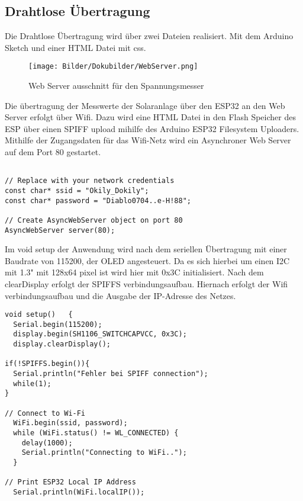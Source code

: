 \documentclass[ngerman]{mucproc}
\newenvironment{minted}[2][]{\endgraf\verbatim}{\endverbatim}
\begin{document}
\subsection{Drahtlose Übertragung}

Die Drahtlose Übertragung wird über zwei Dateien realisiert. Mit dem Arduino Sketch und einer HTML Datei mit css.


\begin{figure}
			\centering
			\texttt{[image: Bilder/Dokubilder/WebServer.png]}
			\caption{Web Server ausschnitt für den Spannungsmesser}
			\label{fig:Web Server}
		\end{figure}


Die übertragung der Messwerte der Solaranlage über den ESP32 an den Web Server erfolgt über Wifi. Dazu wird eine HTML Datei in den Flash Speicher des ESP über einen SPIFF upload mihilfe des Arduino ESP32 Filesystem Uploaders\parencite{SPIFFS.2021}.
\\
Mithilfe der Zugangsdaten für das Wifi-Netz wird ein Asynchroner Web Server auf dem Port 80 gestartet.

\begin{verbatim}

// Replace with your network credentials
const char* ssid = "Okily_Dokily";
const char* password = "Diablo0704..e-H!88";

// Create AsyncWebServer object on port 80
AsyncWebServer server(80);

\end{verbatim}

Im void setup der Anwendung wird nach dem seriellen Übertragung mit einer Baudrate von 115200, der OLED angesteuert. Da es sich hierbei um einen I2C mit 1.3" mit 128x64 pixel ist wird hier mit 0x3C initialisiert\parencite{OLEDCode.2020}. Nach dem clearDisplay erfolgt der SPIFFS verbindungsaufbau. Hiernach erfolgt der Wifi verbindungsaufbau und die Ausgabe der IP-Adresse des Netzes.

\begin{verbatim}
void setup()   {                
  Serial.begin(115200);
  display.begin(SH1106_SWITCHCAPVCC, 0x3C); 
  display.clearDisplay();

if(!SPIFFS.begin()){
  Serial.println("Fehler bei SPIFF connection");
  while(1);
}

// Connect to Wi-Fi
  WiFi.begin(ssid, password);
  while (WiFi.status() != WL_CONNECTED) {
    delay(1000);
    Serial.println("Connecting to WiFi..");
  }

// Print ESP32 Local IP Address
  Serial.println(WiFi.localIP());
\end{verbatim}
\end{document}
